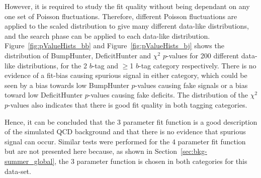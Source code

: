 However, it is required to study the fit quality without being dependant on any one set of Poisson fluctuations.
Therefore, different Poisson fluctuations are applied to the scaled distribution to give many different data-like distributions,
and the search phase can be applied to each data-like distribution.
Figure~\ref{fig:pValueHists_bb} and Figure~\ref{fig:pValueHists_bj} shows the distribution of BumpHunter, DeficitHunter and $\chi^{2}$ $p$-values for 200 different data-like distributions,
for the 2 $b$-tag and $\geq$1 $b$-tag category respectively.
There is no evidence of a fit-bias causing spurious signal in either category,
which could be seen by a bias towards low BumpHunter $p$-values causing fake signals
or a bias toward low DeficitHunter $p$-values causing fake deficits.
The distribution of the $\chi^{2}$ $p$-values also indicates that there is good fit quality in both tagging categories.

Hence, it can be concluded that the 3 parameter fit function is a good description of the simulated QCD background
and that there is no evidence that spurious signal can occur.
Similar tests were performed for the 4 parameter fit function but are not presented here because,
as shown in Section~\ref{sec:bkg-summer_global},
the 3 parameter function is chosen in both categories for this data-set.

